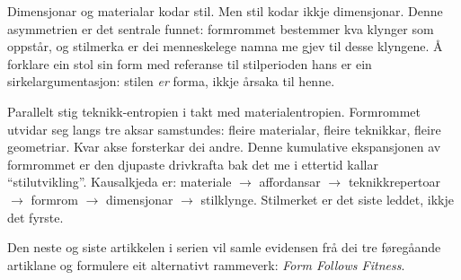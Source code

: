 \documentclass[10pt, a4paper, twocolumn]{article}
\begin{document}
Dimensjonar og materialar kodar stil. Men stil kodar ikkje dimensjonar. Denne asymmetrien er det sentrale funnet: formrommet bestemmer kva klynger som oppstår, og stilmerka er dei menneskelege namna me gjev til desse klyngene. Å forklare ein stol sin form med referanse til stilperioden hans er ein sirkelargumentasjon: stilen \emph{er} forma, ikkje årsaka til henne.

Parallelt stig teknikk-entropien i takt med materialentropien. Formrommet utvidar seg langs tre aksar samstundes: fleire materialar, fleire teknikkar, fleire geometriar. Kvar akse forsterkar dei andre. Denne kumulative ekspansjonen av formrommet er den djupaste drivkrafta bak det me i ettertid kallar ``stilutvikling''. Kausalkjeda er: materiale $\rightarrow$ affordansar $\rightarrow$ teknikkrepertoar $\rightarrow$ formrom $\rightarrow$ dimensjonar $\rightarrow$ stilklynge. Stilmerket er det siste leddet, ikkje det fyrste.

Den neste og siste artikkelen i serien vil samle evidensen frå dei tre føregåande artiklane og formulere eit alternativt rammeverk: \emph{Form Follows Fitness}.




\end{document}
